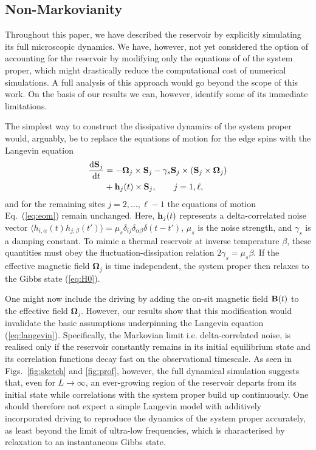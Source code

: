 \documentclass[aps,pre,twocolumn,notitlepage,floats,10pt]{revtex4-1}
\def\d{\mathrm{d}}
\newcommand{\beA}{\begin{equation}\begin{aligned}}
\newcommand{\eeA}{\end{aligned}\end{equation}}
\begin{document}
\subsection{Non-Markovianity}
Throughout this paper, we have described the reservoir by explicitly simulating
its full microscopic dynamics.
We have, however, not yet considered the option of accounting for the reservoir
by modifying only the equations of of the system proper, which might
drastically reduce the computational cost of numerical simulations.
A full analysis of this approach would go beyond the scope of this work.
On the basis of our results we can, however, identify some of its immediate
limitations.

The simplest way to construct the dissipative dynamics of the system proper
would, arguably, be to replace the equations of motion for the edge spins with
the Langevin equation \cite{Ma-Dudarev-Semenov-Woo,Brown}
\beA
\frac{\d {\bf S}_j}{\d t}
& =
-{\boldsymbol\Omega}_j  \times {\bf S}_j
-\gamma_s {\bf S}_j \times \left(  {\bf S}_j \times{\boldsymbol\Omega}_j  \right) \\
&+ {\bf h}_j(t)  \times {\bf S}_j
,\qquad j=1,\ell ,
\label{eq:langevin}
\eeA
and for the remaining sites $j=2,\ldots,\ell-1$ the equations of motion
Eq.~(\ref{eq:eom}) remain unchanged.
Here,
${\bf h}_j(t)$ represents a delta-correlated noise vector 
$\langle h_{i,\alpha}(t) h_{j,\beta}(t') \rangle =
\mu_s\delta_{ij}\delta_{\alpha\beta} \delta(t-t')$,
$\mu_s$ is the noise strength, and $\gamma_s$ is a damping constant.
To mimic a thermal reservoir at inverse temperature $\beta$, these quantities
must obey the fluctuation-dissipation relation $2\gamma_s = \mu_s \beta$.
If the effective magnetic field ${\boldsymbol\Omega}_j$ is time independent,
the system proper then relaxes to the Gibbs state (\ref{eq:H0}).

One might now include the driving by adding the on-sit magnetic field 
${\bf B}(t)$ to the effective field ${\boldsymbol\Omega}_j$.
However, our results show that this modification would invalidate the basic
assumptions underpinning the Langevin equation (\ref{eq:langevin}).
Specifically, the Markovian limit i.e. delta-correlated noise, is realised only
if the reservoir constantly remains in its initial equilibrium state and its
correlation functions decay fast on the observational timescale.
As seen in Figs.~\ref{fig:sketch} and \ref{fig:prof}, however, the full
dynamical simulation suggests that, even for $L\to\infty$, an ever-growing
region of the reservoir departs from its initial state while correlations with
the system proper build up continuously.
One should therefore not expect a simple Langevin model with additively
incorporated driving to reproduce the dynamics of the system proper accurately,
as least beyond the limit of ultra-low frequencies, which is characterised by
relaxation to an instantaneous Gibbs state.
\end{document}
